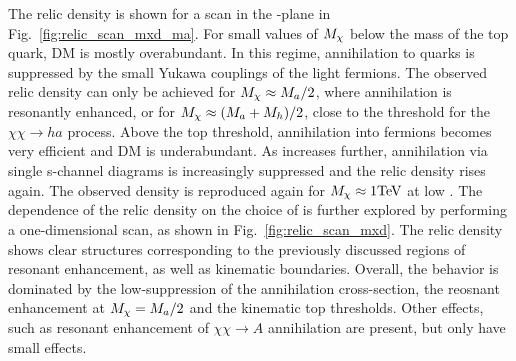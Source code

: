 The relic density is shown for a scan in the \ma-\mDM plane in Fig.~\ref{fig:relic_scan_mxd_ma}.
For small values of $M_{\chi}$ below the mass of the top quark, DM is mostly overabundant. In this regime, annihilation to quarks is suppressed by the small Yukawa couplings of the light fermions. The observed relic density can only be achieved for $M_{\chi}\approx M_{a}/2$, where annihilation is resonantly enhanced, or for $M_{\chi} \approx (M_{a}+M_{h})/2$, close to the threshold for the $\chi\chi\rightarrow h a$ process.
Above the top threshold, annihilation into fermions becomes very efficient and DM is underabundant. As \mDM increases further, annihilation via single s-channel diagrams is increasingly suppressed and the relic density rises again. The observed density is reproduced again for $M_{\chi}\approx1 \mathrm{TeV}$ at low \ma.
The dependence of the relic density on the choice of \mDM is further explored by performing a one-dimensional scan, as shown in Fig.~\ref{fig:relic_scan_mxd}. The relic density shows clear structures corresponding to the previously discussed regions of resonant enhancement, as well as kinematic boundaries. Overall, the behavior is dominated by the low-\mDM suppression of the annihilation cross-section, the reosnant enhancement at $M_{\chi} = M_{a}/2$ and the kinematic top thresholds. Other effects, such as resonant enhancement of $\chi\chi\rightarrow A$ annihilation are present, but only have small effects.

